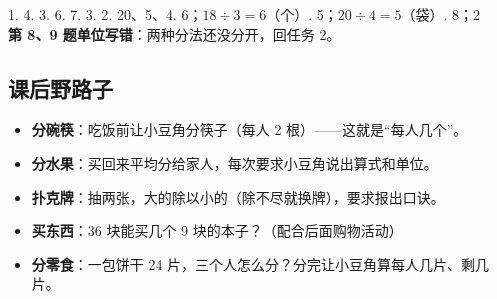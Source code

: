 \begin{ansbox}
1. 4. 3. 6. 7. 3. 2. 20、5、4. 6；$18\div3=6$（个）. 5；$20\div4=5$（袋）. 8；2 \\
\textbf{第 8、9 题单位写错}：两种分法还没分开，回任务 2。
\end{ansbox}

\subsection{课后野路子}

\begin{itemize}
  \item \textbf{分碗筷}：吃饭前让小豆角分筷子（每人 2 根）——这就是“每人几个”。
  \item \textbf{分水果}：买回来平均分给家人，每次要求小豆角说出算式和单位。
  \item \textbf{扑克牌}：抽两张，大的除以小的（除不尽就换牌），要求报出口诀。
  \item \textbf{买东西}：36 块能买几个 9 块的本子？（配合后面购物活动）
  \item \textbf{分零食}：一包饼干 24 片，三个人怎么分？分完让小豆角算每人几片、剩几片。
\end{itemize}
